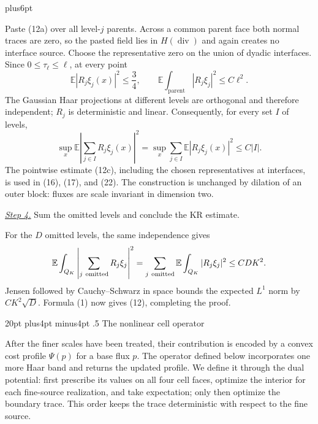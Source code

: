 \documentclass[11pt,reqno]{amsart}
\makeatletter
\def\section{\@startsection{section}{1}{0pt}%
  {20pt plus4pt minus4pt}
  {.5\linespacing}
  {\normalfont\bfseries}}
\theoremstyle{plain}
\theoremstyle{definition}
\theoremstyle{remark}
\renewenvironment{proof}[1][\proofname]{%
  \par
  \pushQED{\qed}%
  \normalfont
  \topsep6pt plus6pt\relax
  \trivlist
  \item[\hskip\labelsep\slshape #1\@addpunct{.}]%
  \ignorespaces
}{%
  \popQED
  \endtrivlist
  \@endpefalse
}
\DeclareRobustCommand{\qed}{%
  \leavevmode\unskip\penalty9999\hbox{}\nobreak
  \ifmmode
    \makebox[0pt][l]{\qquad\hbox{\qedsymbol}}%
  \else
    \qquad\hbox{\qedsymbol}%
  \fi
}
\renewcommand{\qedsymbol}{\rule[.47pt]{4pt}{6pt}}
\numberwithin{equation}{section}
\newcommand{\1}{\mathbf 1}
\makeatother
\begin{document}
\begin{proof}
Paste (12a) over all level-$j$ parents.  Across a common parent face both
normal traces are zero, so the pasted field lies in
$H(\operatorname {div})$ and again creates no interface source.  Choose
the representative zero on the union of dyadic interfaces.  Since
$0\leq\tau_ \ell\leq\ell$, at every point
\begin{equation}
\mathbb E|R_ j\xi_ j(x)|^2\leq \frac34,\qquad
\mathbb E\int_ {\text{parent}}|R_ j\xi_ j|^2\leq C\ell^2.
\tag{12b}
\end{equation}
The Gaussian Haar projections at different levels are orthogonal and
therefore independent; $R_ j$ is deterministic and linear.  Consequently,
for every set $I$ of levels,
\begin{equation}
\sup_ x\mathbb E\left|\sum_ {j\in I}R_ j\xi_ j(x)\right|^2
=\sup_ x\sum_ {j\in I}\mathbb E|R_ j\xi_ j(x)|^2
\leq C|I|.
\tag{12c}
\end{equation}
The pointwise estimate (12c), including the chosen representatives at
interfaces, is used in (16), (17), and (22).  The construction is unchanged
by dilation of an outer block: fluxes are scale invariant in dimension two.

\smallskip\noindent
\underline{\textit{Step 4.}} Sum the omitted levels and conclude the KR estimate.

For the $D$ omitted levels, the same independence gives
\begin{equation*}
\mathbb E\int_ {Q_ K}\left|\sum_ {j\ {\rm omitted}}R_ j\xi_ j\right|^2
=\sum_ {j\ {\rm omitted}}\mathbb E\int_ {Q_ K}|R_ j\xi_ j|^2
\leq CDK^2.
\end{equation*}
Jensen followed by Cauchy--Schwarz in space bounds the expected
$L^1$ norm by $CK^2\sqrt D$.  Formula (1) now gives (12), completing
the proof.

\end{proof}

\section{The nonlinear cell operator}\label{sec:cell-operator}

After the finer scales have been treated, their contribution is encoded
by a convex cost profile $\Psi(p)$ for a base flux $p$.  The operator
defined below incorporates one more Haar band and returns the updated
profile.  We define it through the dual potential: first prescribe its
values on all four cell faces, optimize the interior for each fine-source
realization, and take expectation; only then optimize the boundary trace.
This order keeps the trace deterministic with respect to the fine source.
\end{document}
